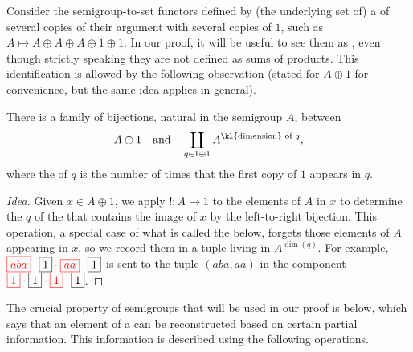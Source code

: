 Consider the semigroup-to-set functors defined by (the underlying set of) a
 of several copies of their argument with several copies of $1$,
such as $A \mapsto A \oplus A \oplus A \oplus 1 \oplus 1$. In our proof, it will
be useful to see them as , even though strictly speaking
they are not defined as sums of products. This identification is allowed by the
following observation (stated for $A\oplus1$ for convenience, but the same idea
applies in general).
\begin{proposition}\label{prop:coproduct-as-polynomial-functor}
  There is a family of bijections, natural in the semigroup $A$, between
  \begin{align*}
    A \oplus 1 \quad \text{and} \quad \coprod_{q \in 1 \oplus 1} A^{\text{\kl{dimension} of $q$}},
  \end{align*}
  where the  of $q$ is the number of times that the
  first copy of $1$ appears in $q$.
\end{proposition}
\begin{proof}[Idea]
  Given $x\in A\oplus1$, we apply $!\colon A\to1$ to the elements of $A$ in $x$
  to determine the  $q$ of the  that contains
  the image of $x$ by the left-to-right bijection. This operation, a special
  case of what is called the  below, forgets those elements of $A$
  appearing in $x$, so we record them in a tuple living in $A^{\dim(q)}$. For
  example, ${\color{red}\boxed{aba}} \cdot {\boxed{1}} \cdot {\color{red}\boxed{aa}} \cdot
  \boxed{1}$ is sent to the tuple $(aba,aa)$ in the component ${\color{red}\boxed{1}}
  \cdot {\boxed{1}} \cdot {\color{red}\boxed{1}} \cdot \boxed{1}$.
\end{proof}

The crucial property of semigroups that will be used in our proof is  below, which says that an element of a  can be reconstructed based on certain partial information. This information is described  using the following operations.

